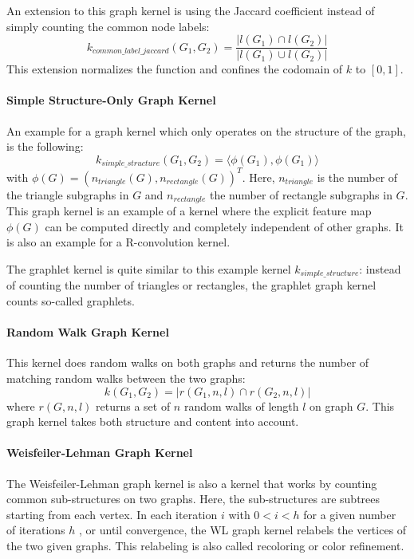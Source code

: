 An extension to this graph kernel is using the Jaccard coefficient instead of simply counting the common node labels:
\begin{equation*}
k_{common\_label\_jaccard}(G_1, G_2) = \frac{| l(G_1) \cap l(G_2) |}{| l(G_1) \cup l(G_2) |}
\end{equation*}
This extension normalizes the function and confines the codomain of $k$ to $[0, 1]$.

\paragraph{Simple Structure-Only Graph Kernel}
An example for a graph kernel which only operates on the structure of the graph, is the following:
\begin{equation*}
k_{simple\_structure}(G_1, G_2) = \langle \phi(G_1), \phi(G_1) \rangle
\end{equation*}
with $\phi(G) = (n_{triangle}(G), n_{rectangle}(G))^T$. Here, $n_{triangle}$ is the number of the triangle subgraphs in $G$ and $n_{rectangle}$ the number of rectangle subgraphs in $G$.
This graph kernel is an example of a kernel where the explicit feature map $\phi(G)$ can be computed directly and completely independent of other graphs.
It is also an example for a R-convolution kernel.

The graphlet kernel is quite similar to this example kernel $k_{simple\_structure}$: instead of counting the number of triangles or rectangles, the graphlet graph kernel counts so-called graphlets.


\paragraph{Random Walk Graph Kernel}
This kernel does random walks on both graphs and returns the number of matching random walks between the two graphs:
\begin{equation*}
    k(G_1, G_2) = |r(G_1, n, l) \cap r(G_2, n, l)|
\end{equation*}
where $r(G, n, l)$ returns a set of $n$ random walks of length $l$ on graph $G$.
This graph kernel takes both structure and content into account.

\paragraph{Weisfeiler-Lehman Graph Kernel}
The Weisfeiler-Lehman graph kernel is also a kernel that works by counting common sub-structures on two graphs.
Here, the sub-structures are subtrees starting from each vertex.
In each iteration $i$ with $0 < i < h$ for a given number of iterations $h$ , or until convergence, the WL graph kernel relabels the vertices of the two given graphs.
This relabeling is also called recoloring or color refinement.

